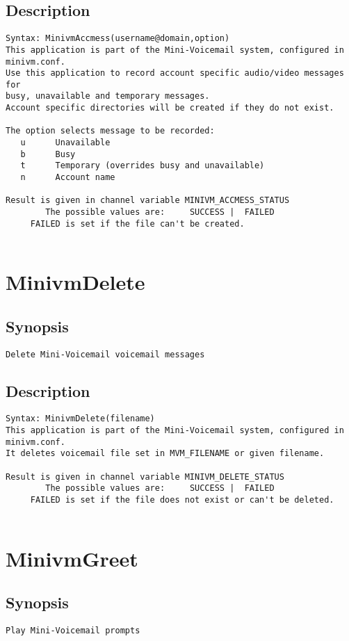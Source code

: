\subsection{Description}
\begin{verbatim}
Syntax: MinivmAccmess(username@domain,option)
This application is part of the Mini-Voicemail system, configured in minivm.conf.
Use this application to record account specific audio/video messages for
busy, unavailable and temporary messages.
Account specific directories will be created if they do not exist.

The option selects message to be recorded:
   u      Unavailable
   b      Busy
   t      Temporary (overrides busy and unavailable)
   n      Account name

Result is given in channel variable MINIVM_ACCMESS_STATUS
        The possible values are:     SUCCESS |  FAILED
	 FAILED is set if the file can't be created.


\end{verbatim}


\section{MinivmDelete}
\subsection{Synopsis}
\begin{verbatim}
Delete Mini-Voicemail voicemail messages
\end{verbatim}
\subsection{Description}
\begin{verbatim}
Syntax: MinivmDelete(filename)
This application is part of the Mini-Voicemail system, configured in minivm.conf.
It deletes voicemail file set in MVM_FILENAME or given filename.

Result is given in channel variable MINIVM_DELETE_STATUS
        The possible values are:     SUCCESS |  FAILED
	 FAILED is set if the file does not exist or can't be deleted.


\end{verbatim}


\section{MinivmGreet}
\subsection{Synopsis}
\begin{verbatim}
Play Mini-Voicemail prompts
\end{verbatim}
